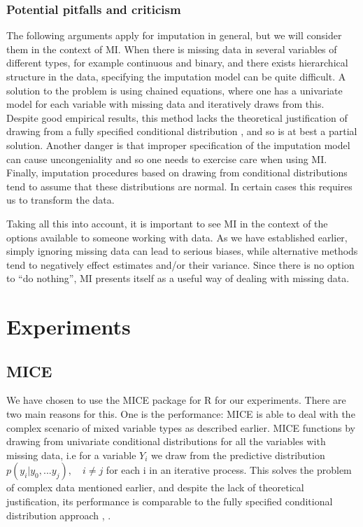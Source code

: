 \documentclass{article}
\begin{document}
	\subsubsection{Potential pitfalls and criticism}
	The following arguments apply for imputation in general, but we will consider them in the context of MI. When there is missing data in several variables of different types, for example continuous and binary, and there exists hierarchical structure in the data, specifying the imputation model can be quite difficult. A solution to the problem is using chained equations, where one has a univariate model for each variable with missing data and iteratively draws from this. Despite good empirical results, this method lacks the theoretical justification of drawing from a fully specified conditional distribution \cite{Little2019}, and so is at best a partial solution. Another danger is that improper specification of the imputation model can cause uncongeniality and so one needs to exercise care when using MI. Finally, imputation procedures based on drawing from conditional distributions tend to assume that these distributions are normal. In certain cases this requires us to transform the data.
	
	Taking all this into account, it is important to see MI in the context of the options available to someone working with data. As we have established earlier, simply ignoring missing data can lead  to serious biases, while alternative methods tend to negatively effect estimates and/or their variance. Since there is no option to \enquote{do nothing}, MI presents itself as a useful way of dealing with missing data.
	
	\section{Experiments}
	
	
	\subsection{MICE}
	We have chosen to use the MICE package for R \cite{Buuren2011} for our experiments. There are two main reasons for this. One is the performance: MICE is able to deal with the complex scenario of mixed variable types as described earlier. MICE functions by drawing from univariate conditional distributions for all the variables with missing data, i.e for a variable $Y_{i}$ we draw from the predictive distribution $p(y_{i}|y_{0}, ... y_{j}), \quad i\neq j$ for each i in an iterative process. This solves the problem of complex data mentioned earlier, and despite the lack of theoretical justification, its performance is comparable to the fully specified conditional distribution approach \cite{Lee}, \cite{Little2019}.
	
\end{document}
